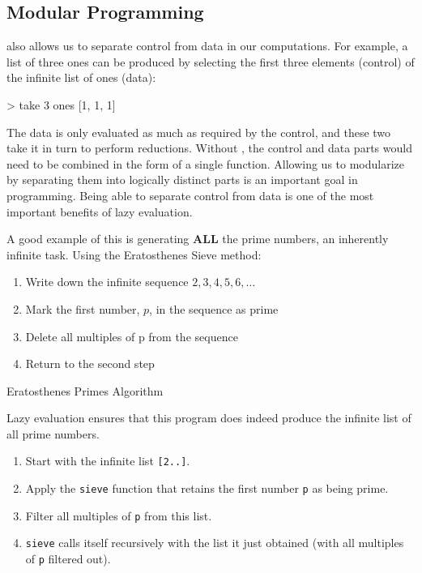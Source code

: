 \subsection{Modular Programming}\label{subsec:Modular_Programming}
 also allows us to separate control from data in our computations.
For example, a list of three ones can be produced by selecting the first three elements (control) of the infinite list of ones (data):
\begin{haskellsource}
> take 3 ones
[1, 1, 1]
\end{haskellsource}

The data is only evaluated as much as required by the control, and these two take it in turn to perform reductions.
Without , the control and data parts would need to be combined in the form of a single function.
Allowing us to modularize by separating them into logically distinct parts is an important goal in programming.
Being able to separate control from data is one of the most important benefits of lazy evaluation.

A good example of this is generating \textbf{ALL} the prime numbers, an inherently infinite task.
Using the Eratosthenes Sieve method:
\begin{enumerate}[noitemsep]
\item Write down the infinite sequence $2, 3, 4, 5, 6, \ldots$
\item Mark the first number, $p$, in the sequence as prime
\item Delete all multiples of p from the sequence
\item Return to the second step
\end{enumerate}

\begin{listing}[h!tbp]
\caption{Eratosthenes Primes Algorithm}
\label{lst:Eratosthenes_Primes}
\end{listing}

Lazy evaluation ensures that this program does indeed produce the infinite list of all prime numbers.
\begin{enumerate}[noitemsep]
\item Start with the infinite list \texttt{[2..]}.
\item Apply the \texttt{sieve} function that retains the first number \texttt{p} as being prime.
\item Filter all multiples of \texttt{p} from this list.
\item \texttt{sieve} calls itself recursively with the list it just obtained (with all multiples of \texttt{p} filtered out).
\end{enumerate}

